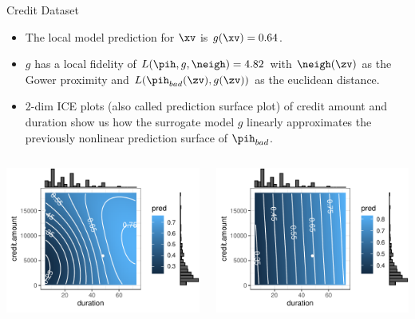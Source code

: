 \documentclass[11pt,compress,t,notes=noshow, xcolor=table]{beamer}
\begin{document}
\begin{vbframe}{Credit Dataset}
\begin{itemize}
	\item The local model prediction for $\xv$ is $g(\xv) = 0.64$. 
	\item $g$ has a local fidelity of $L(\pih, g, \neigh) = 4.82$ with $\neigh(\zv)$ as the Gower proximity and $L(\pih_{bad}(\zv), g(\zv))$ as the euclidean distance. 
	\item 2-dim ICE plots (also called prediction surface plot) of credit amount and duration show us how the surrogate model $g$ linearly approximates the previously nonlinear prediction surface of $\pih_{bad}$. 
\end{itemize}
\vspace{-0.4cm}
 \begin{columns}
	\begin{column}{0.47\textwidth}
		\begin{center}
		\includegraphics[width=1\textwidth]{figure/lime_credit_ice1.pdf}
		\end{center}		
	\end{column}
	\begin{column}{0.46\textwidth}  
		\begin{center}
				\includegraphics[width=1\textwidth]{figure/lime_credit_ice2.pdf}
		\end{center}
			

\end{column}
\end{columns}
\end{vbframe}
\end{document}
